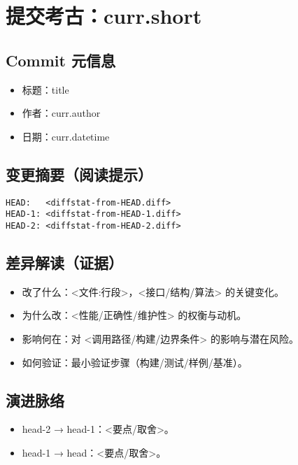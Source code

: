\section{提交考古：{curr.short}}

\subsection*{Commit 元信息}
\begin{itemize}
  \item 标题：{title}
  \item 作者：{curr.author}
  \item 日期：{curr.datetime}
\end{itemize}

\subsection*{变更摘要（阅读提示）}
\begin{verbatim}
HEAD:   <diffstat-from-HEAD.diff>
HEAD-1: <diffstat-from-HEAD-1.diff>
HEAD-2: <diffstat-from-HEAD-2.diff>
\end{verbatim}

\subsection*{差异解读（证据）}
\begin{itemize}
  \item 改了什么：<文件:行段>，<接口/结构/算法> 的关键变化。
  \item 为什么改：<性能/正确性/维护性> 的权衡与动机。
  \item 影响何在：对 <调用路径/构建/边界条件> 的影响与潜在风险。
  \item 如何验证：最小验证步骤（构建/测试/样例/基准）。
\end{itemize}

\subsection*{演进脉络}
\begin{itemize}
  \item head-2 → head-1：<要点/取舍>。
  \item head-1 → head：<要点/取舍>。
\end{itemize}

